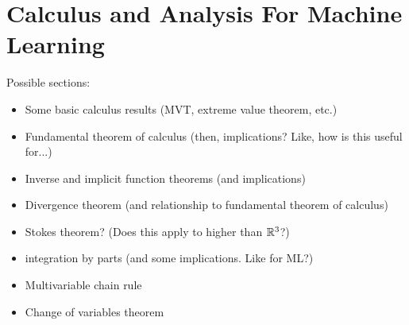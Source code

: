 \chapter{Calculus and Analysis For Machine Learning}

Possible sections:
\begin{itemize}
  \item Some basic calculus results (MVT, extreme value theorem, etc.) 
  \item Fundamental theorem of calculus (then, implications? Like, how is this useful for...)
  \item Inverse and implicit function theorems (and implications) 
  \item Divergence theorem (and relationship to fundamental theorem of calculus)
  \item Stokes theorem? (Does this apply to higher than $\mathbb{R}^3$?) 
  \item integration by parts (and some implications. Like for ML?) 
  \item Multivariable chain rule
  \item Change of variables theorem
\end{itemize}
